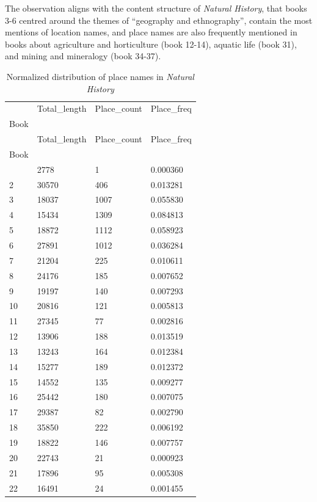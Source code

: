 \documentclass[
  12pt,
]{article}
\begin{document}
The observation aligns with the content structure of \emph{Natural
History}, that books 3-6 centred around the themes of ``geography and
ethnography'', contain the most mentions of location names, and place
names are also frequently mentioned in books about agriculture and
horticulture (book 12-14), aquatic life (book 31), and mining and
mineralogy (book 34-37).

\hypertarget{tbl-place_book_distribution}{}
\begin{longtable}[]{@{}llll@{}}
\caption{\label{tbl-place_book_distribution}Normalized distribution of
place names in \emph{Natural History}}\tabularnewline
\toprule\noalign{}
& Total\_length & Place\_count & Place\_freq \\
Book & & & \\
\midrule\noalign{}
\endfirsthead
\toprule\noalign{}
& Total\_length & Place\_count & Place\_freq \\
Book & & & \\
\midrule\noalign{}
\endhead
\bottomrule\noalign{}
\endlastfoot
1 & 2778 & 1 & 0.000360 \\
2 & 30570 & 406 & 0.013281 \\
3 & 18037 & 1007 & 0.055830 \\
4 & 15434 & 1309 & 0.084813 \\
5 & 18872 & 1112 & 0.058923 \\
6 & 27891 & 1012 & 0.036284 \\
7 & 21204 & 225 & 0.010611 \\
8 & 24176 & 185 & 0.007652 \\
9 & 19197 & 140 & 0.007293 \\
10 & 20816 & 121 & 0.005813 \\
11 & 27345 & 77 & 0.002816 \\
12 & 13906 & 188 & 0.013519 \\
13 & 13243 & 164 & 0.012384 \\
14 & 15277 & 189 & 0.012372 \\
15 & 14552 & 135 & 0.009277 \\
16 & 25442 & 180 & 0.007075 \\
17 & 29387 & 82 & 0.002790 \\
18 & 35850 & 222 & 0.006192 \\
19 & 18822 & 146 & 0.007757 \\
20 & 22743 & 21 & 0.000923 \\
21 & 17896 & 95 & 0.005308 \\
22 & 16491 & 24 & 0.001455 \\

\end{longtable}
\end{document}
